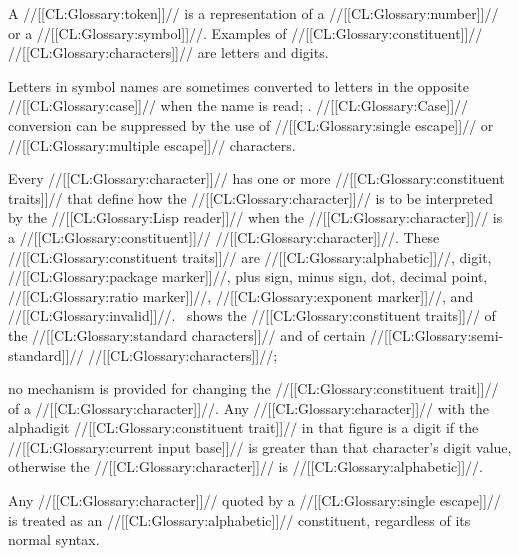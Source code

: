 {A //[[CL:Glossary:token]]// is a representation of a //[[CL:Glossary:number]]// or a //[[CL:Glossary:symbol]]//.   Examples of //[[CL:Glossary:constituent]]// //[[CL:Glossary:characters]]// are letters and digits.

Letters in symbol names are sometimes converted to  letters in the opposite //[[CL:Glossary:case]]// when the name is read; \seesection\ReadtableCaseReadEffect. //[[CL:Glossary:Case]]// conversion can be suppressed by the use  of //[[CL:Glossary:single escape]]// or //[[CL:Glossary:multiple escape]]// characters.

 

Every //[[CL:Glossary:character]]// has one or more //[[CL:Glossary:constituent traits]]// that define how the //[[CL:Glossary:character]]// is to be interpreted by the //[[CL:Glossary:Lisp reader]]// when the //[[CL:Glossary:character]]// is a //[[CL:Glossary:constituent]]// //[[CL:Glossary:character]]//. These //[[CL:Glossary:constituent traits]]// are 
     //[[CL:Glossary:alphabetic]]//,                  
     digit,
     //[[CL:Glossary:package marker]]//,
     plus sign,
     minus sign, 
     dot,
     decimal point,
     //[[CL:Glossary:ratio marker]]//,
     //[[CL:Glossary:exponent marker]]//,
 and //[[CL:Glossary:invalid]]//. \Figref\ConstituentTraitsOfStdChars\ shows the //[[CL:Glossary:constituent traits]]// of the //[[CL:Glossary:standard characters]]// and of certain //[[CL:Glossary:semi-standard]]// //[[CL:Glossary:characters]]//;

no mechanism is provided for changing the //[[CL:Glossary:constituent trait]]// of a //[[CL:Glossary:character]]//. Any //[[CL:Glossary:character]]// with the alphadigit //[[CL:Glossary:constituent trait]]// in that figure is a digit if the //[[CL:Glossary:current input base]]// is greater than that character's digit value, otherwise the //[[CL:Glossary:character]]// is //[[CL:Glossary:alphabetic]]//.  

Any //[[CL:Glossary:character]]// quoted by a //[[CL:Glossary:single escape]]//  is treated as an //[[CL:Glossary:alphabetic]]// constituent, regardless of its normal syntax.

}
